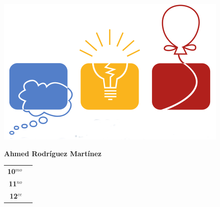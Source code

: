 \begin{minipage}{0.2\textwidth}
	\includegraphics[width=\linewidth]{img/icpc.png} %
\end{minipage}
\hfill
\begin{minipage}{0.7\textwidth}
	\textbf{Ahmed Rodríguez Martínez}
	
	\vspace*{0.1in}
	\begin{tabular}{rl}
		
		\textbf{10$^{mo}$} &   \\
		
		\textbf{11$^{no}$} &  \\
		
		\textbf{12$^{ce}$} &   \\
		
		
	\end{tabular}
\end{minipage}

